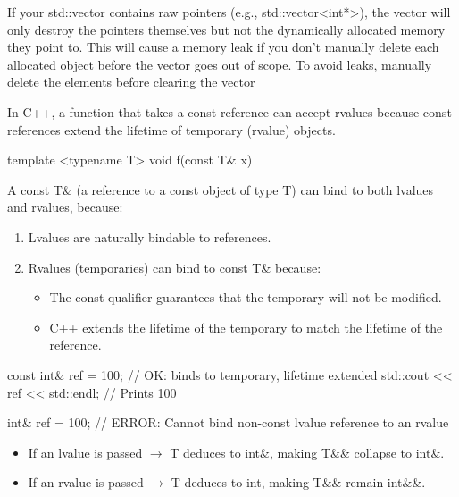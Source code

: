 \documentclass{report}
\begin{document}
    \pagebreak 
    \bigbreak \noindent 
    If your std::vector contains raw pointers (e.g., std::vector<int*>), the vector will only destroy the pointers themselves but not the dynamically allocated memory they point to. This will cause a memory leak if you don’t manually delete each allocated object before the vector goes out of scope.
    \bigbreak \noindent 
    To avoid leaks, manually delete the elements before clearing the vector

    \pagebreak 
    \bigbreak \noindent 
    In C++, a function that takes a const reference can accept rvalues because const references extend the lifetime of temporary (rvalue) objects.
    \bigbreak \noindent 
    \begin{cppcode}
        template <typename T>
        void f(const T& x) {}
    \end{cppcode}
    \bigbreak \noindent 
    A const T\& (a reference to a const object of type T) can bind to both lvalues and rvalues, because:
    \begin{enumerate}
        \item Lvalues are naturally bindable to references.
        \item Rvalues (temporaries) can bind to const T\& because:
            \begin{itemize}
                \item The const qualifier guarantees that the temporary will not be modified.
                \item C++ extends the lifetime of the temporary to match the lifetime of the reference.
            \end{itemize}
    \end{enumerate}
    \bigbreak \noindent 
    \begin{cppcode}
        const int& ref = 100; // OK: binds to temporary, lifetime extended
        std::cout << ref << std::endl; // Prints 100

        int& ref = 100; // ERROR: Cannot bind non-const lvalue reference to an rvalue
    \end{cppcode}
    \bigbreak \noindent 
    \begin{itemize}
        \item If an lvalue is passed $\to$ T deduces to int\&, making T\&\& collapse to int\&.
        \item If an rvalue is passed $\to$ T deduces to int, making T\&\& remain int\&\&.
    \end{itemize}



    








    

    
\end{document}
